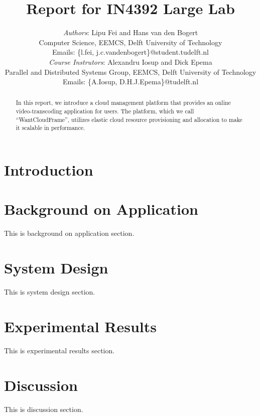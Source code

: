 \documentclass[10pt, a4paper, twoside, twocolumn, technote]{IEEEtran}
\begin{document}
\title{Report for IN4392 Large Lab}
\author{\textit{Authors}: Lipu Fei and Hans van den Bogert\\
Computer Science, EEMCS, Delft University of Technology\\
Emails: \{l.fei, j.c.vandenbogert\}@student.tudelft.nl\\
\textit{Course Instrutors}: Alexandru Iosup and Dick Epema\\
Parallel and Distributed Systems Group, EEMCS, Delft University of Technology\\
Emails: \{A.Iosup, D.H.J.Epema\}@tudelft.nl}


\maketitle


\begin{abstract}
In this report, we introduce a cloud management platform that provides an online video-transcoding application for users. The platform, which we call ``WantCloudFrame'', utilizes elastic cloud resource provisioning and allocation to make it scalable in performance.
\end{abstract}

\section{Introduction}


\section{Background on Application}\label{background}
This is background on application section.

\section{System Design}\label{design}
This is system design section.

\section{Experimental Results}\label{experiment}
This is experimental results section.

\section{Discussion}\label{discussion}
This is discussion section.
\end{document}
